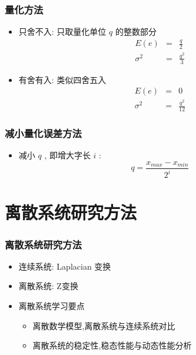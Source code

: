 \documentclass[table]{beamer}
\begin{document}
\begin{frame}
\frametitle{量化方法}
\label{sec-3-4}

\begin{itemize}
\item <2->只舍不入: 只取量化单位  $q$  的整数部分
       \begin{eqnarray*}
        E(e) &=& \frac{q}{2} \\
        \sigma^2 &=& \frac{q^2}{3}
       \end{eqnarray*}
\item <3->有舍有入: 类似四舍五入
       \begin{eqnarray*}
        E(e) &=& 0 \\
        \sigma^2 &=& \frac{q^2}{12}
       \end{eqnarray*}
\end{itemize}
\end{frame}
\begin{frame}
\frametitle{减小量化误差方法}
\label{sec-3-5}

\begin{itemize}
\item 减小  $q$  , 即增大字长  $i$  :   
         \[q=\frac{x_{max}-x_{min}}{2^i}\]
\end{itemize}
\end{frame}
\section{离散系统研究方法}
\label{sec-4}
\begin{frame}
\frametitle{离散系统研究方法}
\label{sec-4-1}

\begin{itemize}
\item 连续系统: Laplacian 变换
\item <2->离散系统: Z变换
\item <3->离散系统学习要点
\begin{itemize}
\item <4->离散数学模型,离散系统与连续系统对比
\item <5->离散系统的稳定性,稳态性能与动态性能分析
\end{itemize}
\end{itemize}
\end{frame}
\end{document}
